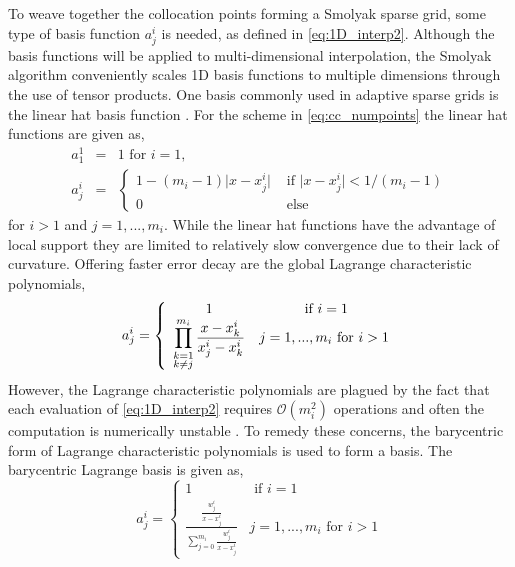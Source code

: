 To weave together the collocation points forming a Smolyak sparse grid, some type of basis function $a_{j}^i$ is needed, as defined in \ref{eq:1D_interp2}. Although the basis functions will be applied to multi-dimensional interpolation, the Smolyak algorithm conveniently scales 1D basis functions to multiple dimensions through the use of tensor products. One basis commonly used  in adaptive sparse grids is the linear hat basis function \cite{Agarwal}. For the scheme in \ref{eq:cc_numpoints} the linear hat functions are given as, 
\begin{eqnarray} \label{eq:linear_hat_basis}
    a_{1}^{1} &=& 1 \text{ for } i=1, \\
    a_{j}^{i} &=& \left\{
     \begin{array}{cc}
      1-(m_i-1)\vert x-x_j^i\vert   & \text{ if }
      \vert x-x_j^i\vert < 1/(m_i-1) \\
       0   & \text{ else } \nonumber
     \end{array}
    \right.
\end{eqnarray}
for $i>1$ and $j=1,...,m_i$. While the linear hat functions have the advantage of local support they are limited to relatively slow convergence due to their lack of curvature. Offering faster error decay are the global Lagrange characteristic polynomials, 
\begin{equation} \label{eq:lagrange_basis}
    a_j^i = \left\{
     \begin{array}{cc}
      1   & \text{ if } i=1 \\
      \displaystyle \prod_{\begin{subarray}{l}
              k=1 \\
              k \neq j
             \end{subarray}}^{m_i}
       \frac{x-x_k^i}{x_j^i-x_k^i}   & j=1,...,m_i \text{ for } i>1    
     \end{array}
    \right.
\end{equation}  
However, the Lagrange characteristic polynomials are plagued by the fact that each evaluation of \ref{eq:1D_interp2} requires $\mathcal{O}(m_i^2)$ operations and  often the computation is numerically unstable \cite{BaryCentIntrp}. To remedy these concerns, the barycentric form of Lagrange characteristic polynomials is used to form a basis. The barycentric Lagrange basis is given as,
\begin{equation} \label{eq:barycentric_basis}
    a_j^i = \left\{
     \begin{array}{cc}
      1   & \text{ if } i=1 \\
      \displaystyle \frac{\frac{w_j^i}{x-x_j^i} }
       {\sum_{j=0}^{m_i} 
        \frac{w_j^i}{x-x_j^i}}   & j=1,...,m_i \text{ for } i>1
     \end{array}
    \right.
\end{equation} 

